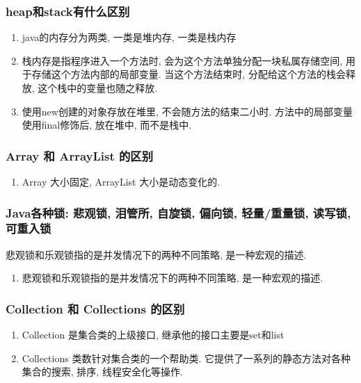 \documentclass[UTF8]{ctexart}
\begin{document}
\subsubsection{heap和stack有什么区别}
\begin{enumerate}
	\item java的内存分为两类, 一类是堆内存, 一类是栈内存
	\item 栈内存是指程序进入一个方法时, 会为这个方法单独分配一块私属存储空间, 用于存储这个方法内部的局部变量. 当这个方法结束时, 分配给这个方法的栈会释放, 这个栈中的变量也随之释放.
	\item 使用new创建的对象存放在堆里, 不会随方法的结束二小时. 方法中的局部变量使用final修饰后, 放在堆中, 而不是栈中.
	
\end{enumerate}

\subsubsection{Array 和 ArrayList 的区别}
\begin{enumerate}
	\item Array 大小固定, ArrayList 大小是动态变化的.
\end{enumerate}
\subsubsection{Java各种锁: 悲观锁, 泪管所, 自旋锁, 偏向锁, 轻量/重量锁, 读写锁, 可重入锁}
悲观锁和乐观锁指的是并发情况下的两种不同策略, 是一种宏观的描述.
\par

\begin{enumerate}
	\item 悲观锁和乐观锁指的是并发情况下的两种不同策略, 是一种宏观的描述.
	
\end{enumerate}
\subsubsection{Collection 和 Collections 的区别}
\begin{enumerate}
	\item Collection 是集合类的上级接口, 继承他的接口主要是set和list
	\item Collections 类数针对集合类的一个帮助类. 它提供了一系列的静态方法对各种集合的搜索, 排序, 线程安全化等操作.
\end{enumerate}
\end{document}
